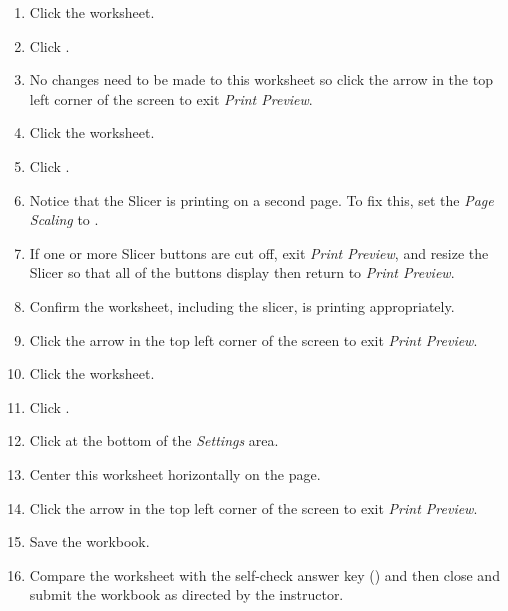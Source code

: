 \begin{enumerate}
	\item Click the  worksheet.
	\item Click .
	\item No changes need to be made to this worksheet so click the arrow in the top left corner of the screen to exit \textit{Print Preview}.

	\item Click the  worksheet.
	\item Click .
	\item Notice that the Slicer is printing on a second page. To fix this, set the \textit{Page Scaling} to .
	\item If one or more Slicer buttons are cut off, exit \textit{Print Preview}, and resize the Slicer so that all of the buttons display then return to \textit{Print Preview}.
	\item Confirm the worksheet, including the slicer, is printing appropriately. 
	\item Click the arrow in the top left corner of the screen to exit \textit{Print Preview}.

	\item Click the  worksheet.
	\item Click .
	\item Click  at the bottom of the \textit{Settings} area.
	\item Center this worksheet horizontally on the page. 
	\item Click the arrow in the top left corner of the screen to exit \textit{Print Preview}.

	\item Save the  workbook.
	\item Compare the worksheet with the self-check answer key () and then close and submit the  workbook as directed by the instructor.
\end{enumerate}

